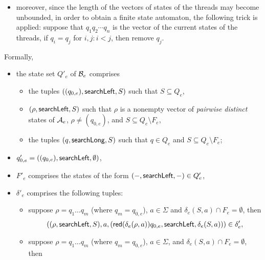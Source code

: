 \begin{itemize}
%
	\item moreover, since the length of the vectors of states of the threads may become unbounded, in order to obtain a finite state automaton, the following trick is applied: suppose that $q_1 q_2 \cdots q_n$ is the vector of the current states of the threads, if $q_i = q_j$ for $i, j: i < j$, then remove $q_j$.
\end{itemize}


Formally, 
\begin{itemize}
	\item the state set $Q'_e$ of $\mathcal{B}_e$ comprises 
	\begin{itemize}
		\item the tuples $((q_{0,e}), \mathsf{searchLeft}, S)$ such that $S \subseteq Q_e$,
		\item $(\rho, \mathsf{searchLeft}, S)$ such that  $\rho$ is a nonempty vector of \emph{pairwise distinct} states of $\mathcal{A}_e$, $\rho \neq (q_{0,e})$, and $S \subseteq Q_e \setminus F_e$, 
		\item the tuples $(q, \mathsf{searchLong}, S)$ such that $q \in Q_e$ and $S \subseteq Q_e \setminus F_e$;
	\end{itemize}
	\item $q'_{0,e}= ((q_{0,e}), \mathsf{searchLeft}, \emptyset)$,
	\item $F'_{e}$ comprises the states of the form $(-, \mathsf{searchLeft}, -) \in Q'_e$,
	\item $\delta'_e$ comprises the following tuples: 
	\begin{itemize}
		\item suppose $\rho = q_1 \dots q_m$ (where $q_m = q_{0,e}$),  $a \in \Sigma$ and $\delta_e(S,a) \cap F_e = \emptyset$, then 
		$$((\rho, \mathsf{searchLeft}, S), a, (\mathsf{red}(\delta_e(\rho,a))q_{0,e}, \mathsf{searchLeft}, \delta_e(S,a))) \in \delta'_e,$$ 
		\item suppose $\rho = q_1 \dots q_m$ (where $q_m = q_{0,e}$),  $a \in \Sigma$, and $\delta_e(S,a) \cap F_e = \emptyset$, then 

\end{itemize}
\end{itemize}
